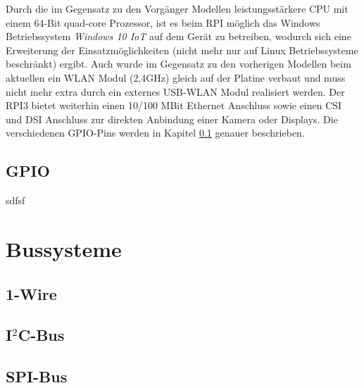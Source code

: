 Durch die im Gegensatz zu den Vorgänger Modellen leistungsstärkere CPU mit einem 64-Bit quad-core Prozessor, ist es beim RPI möglich das Windows Betriebssystem \textit{Windows 10 IoT} auf dem Gerät zu betreiben, wodurch sich eine Erweiterung der Einsatzmöglichkeiten (nicht mehr nur auf Linux Betriebssysteme beschränkt) ergibt. Auch wurde im Gegensatz zu den vorherigen Modellen beim aktuellen ein WLAN Modul (2,4\;GHz) gleich auf der Platine verbaut und muss nicht mehr extra durch ein externes USB-WLAN Modul realisiert werden. Der \ac{RPI}3 bietet weiterhin einen 10/100 MBit Ethernet Anschluss sowie einen \ac{CSI} und \ac{DSI} Anschluss zur direkten Anbindung einer Kamera oder Displays. Die verschiedenen GPIO-Pins werden in Kapitel \ref{subsection_GPIO} genauer beschrieben.

\subsection{GPIO}
\label{subsection_GPIO}
sdfsf



\section{Bussysteme}
\label{section_Bussysteme}

\subsection{1-Wire}
\label{subsection_1Wire}

\subsection{I$^2$C-Bus}
\label{subsection_I2C}

\subsection{SPI-Bus}
\label{subsection_SPI}